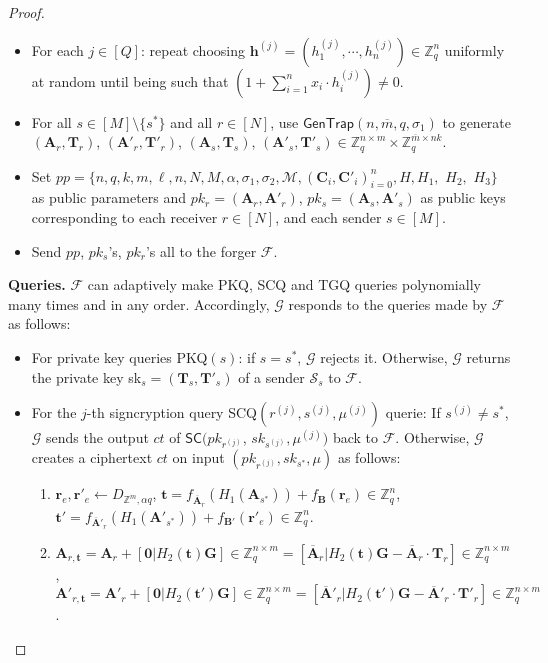 \documentclass[a4paper,11pt,onecolumn]{elsarticle}
\def\bf{\mathbf}
\begin{document}
\begin{proof}
\begin{itemize}
		\item For each $j \in [Q]$: repeat choosing $\textbf{h}^{(j)}=(h^{(j)}_1, \cdots, h^{(j)}_{n})\in \mathbb{Z}_q^n$ uniformly at random until being such that $(1+\sum_{i=1}^{n}x_i \cdot h^{(j)}_i)\neq 0$.
			\item For all $s \in [M]\setminus \{s^*\}$ and all $r\in [N]$, use $\textsf{GenTrap}(n, \overline{m},q, \sigma_1)$ to generate  $(\mathbf{A}_r, \mathbf{T}_r)$, $ (\mathbf{A}'_r, \mathbf{T}'_r)$, $(\mathbf{A}_s, \mathbf{T}_s)$, $(\mathbf{A}'_s, \mathbf{T}'_s) \in  \mathbb{Z}_q^{n \times m} \times \mathbb{Z}_q^{\overline{m}\times nk}$.
			
			
			\item Set $pp=\{n,q,k, m,\ell, n, N, M, \alpha, \sigma_1, \sigma_2,  \mathcal{M}, (\bf{C}_i, \bf{C}'_i)_{i=0}^{n}, H, H_1, $ $H_2, $ $H_3\}$ as public parameters and  $pk_{r}=(\mathbf{A}_r, \mathbf{A}'_r)$, $pk_{s}=(\mathbf{A}_s, \mathbf{A}'_s)$ as public keys corresponding to each receiver $r \in [N]$, and each sender $s\in [M]$.
			\item Send $pp$, $pk_s$'s, $pk_r$'s all to the forger $\mathcal{F}$.
			\end{itemize}
		 \textbf{Queries.}  $\mathcal{F}$ can adaptively make  PKQ,  SCQ and  TGQ queries  polynomially many times  and in any order. Accordingly, $\mathcal{G}$ responds to the queries made by $\mathcal{F}$  as follows:
			\begin{itemize}
				\item For private key queries PKQ$(s)$: if  $s=s^*$, $\mathcal{G}$ rejects it. Otherwise, $\mathcal{G}$ returns the private key sk$_{s}=(\mathbf{T}_s,\mathbf{T}'_s )$ of a sender $\mathcal{S}_{s}$ to $\mathcal{F}$.
			
				\item For the $j$-th signcryption query SCQ$(r^{(j)},s^{(j)},\mu^{(j)})$ querie: If $s^{(j)}\neq s^*$, 	$\mathcal{G}$ sends the output $ct$ of  $\textsf{SC}(pk_{r^{(j)}}$, $sk_{s^{(j)}},\mu^{(j)})$ back to $\mathcal{F}$. Otherwise, $\mathcal{G}$ creates a ciphertext $ct$ on input $(pk_{r^{(j)}},sk_{s^*},\mu)$   as follows: 	
			\begin{enumerate}
			\item  $\textbf{r}_e,  \textbf{r}'_e \leftarrow D_{\mathbb{Z}^{m }, \alpha q}$, $\textbf{t}=f_{\overline{\textbf{A}}_r}(H_1(\textbf{A}_{s^*}))+f_{\textbf{B}}(\textbf{r}_e)\in \mathbb{Z}_q^{n}$,\\
			$\textbf{t}'=f_{\overline{\textbf{A}}'_r}(H_1(\textbf{A}'_{s^*}))+f_{\textbf{B}'}(\textbf{r}'_e)\in \mathbb{Z}_q^{n}$.
			\item $\textbf{A}_{r,\textbf{t}}=\textbf{A}_{r}+[\textbf{0}|H_2(\textbf{t})\mathbf{G}]\in \mathbb{Z}_q^{n \times m}=[\overline{\mathbf{A}}_r|H_2(\textbf{t})\mathbf{G}-\overline{\mathbf{A}}_r\cdot \mathbf{T}_r]\in \mathbb{Z}_q^{n \times m}$,\\
			$\textbf{A}'_{r,\textbf{t}}=\textbf{A}'_{r}+[\textbf{0}|H_2(\textbf{t}')\mathbf{G}]\in \mathbb{Z}_q^{n \times m}=[\overline{\mathbf{A}}'_r|H_2(\textbf{t}')\mathbf{G}-\overline{\mathbf{A}}'_r\cdot \mathbf{T}'_r]\in \mathbb{Z}_q^{n \times m}$.
									

\end{enumerate}
\end{itemize}
\end{proof}
\end{document}
